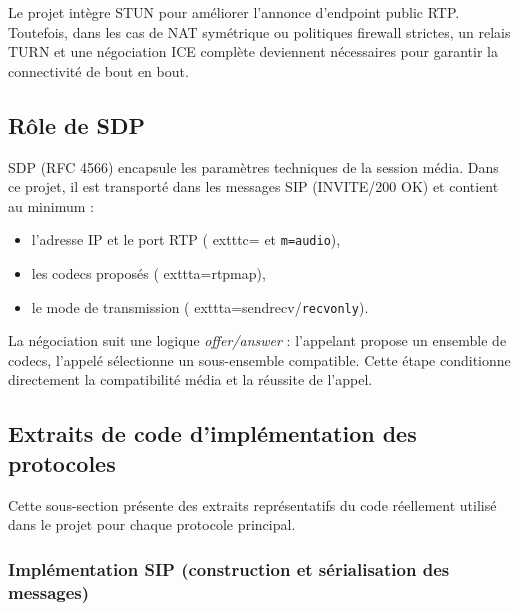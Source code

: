 \documentclass[12pt,a4paper]{article}
\begin{document}
Le projet intègre STUN pour améliorer l'annonce d'endpoint public RTP. Toutefois, dans les cas de NAT symétrique ou politiques firewall strictes, un relais TURN et une négociation ICE complète deviennent nécessaires pour garantir la connectivité de bout en bout.

\subsection{Rôle de SDP}

SDP (RFC 4566) encapsule les paramètres techniques de la session média. Dans ce projet, il est transporté dans les messages SIP (INVITE/200 OK) et contient au minimum :
\begin{itemize}[leftmargin=1.2cm]
    \item l'adresse IP et le port RTP (
	exttt{c=} et \texttt{m=audio}),
    \item les codecs proposés (
	exttt{a=rtpmap}),
    \item le mode de transmission (
	exttt{a=sendrecv}/\texttt{recvonly}).
\end{itemize}

La négociation suit une logique \emph{offer/answer} : l'appelant propose un ensemble de codecs, l'appelé sélectionne un sous-ensemble compatible. Cette étape conditionne directement la compatibilité média et la réussite de l'appel.

\subsection{Extraits de code d'implémentation des protocoles}

Cette sous-section présente des extraits représentatifs du code réellement utilisé dans le projet pour chaque protocole principal.

\subsubsection{Implémentation SIP (construction et sérialisation des messages)}
\end{document}
